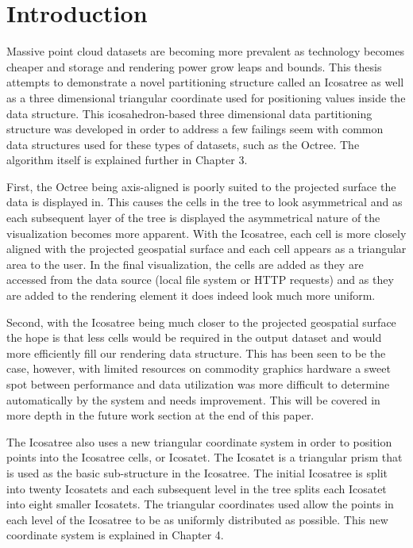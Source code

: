 \chapter{Introduction}


Massive point cloud datasets are becoming more prevalent as technology becomes
cheaper and storage and rendering power grow leaps and bounds. This thesis
attempts to demonstrate a novel partitioning structure called an Icosatree as
well as a three dimensional triangular coordinate used for positioning values
inside the data structure. This icosahedron-based three dimensional data
partitioning structure was developed in order to address a few failings seem
with common data structures used for these types of datasets, such as the
Octree. The algorithm itself is explained further in Chapter 3.

First, the Octree being axis-aligned is poorly suited to the projected surface
the data is displayed in. This causes the cells in the tree to look asymmetrical
and as each subsequent layer of the tree is displayed the asymmetrical nature of
the visualization becomes more apparent. With the Icosatree, each cell is more
closely aligned with the projected geospatial surface and each cell appears as a
triangular area to the user. In the final visualization, the cells are added as
they are accessed from the data source (local file system or HTTP requests) and
as they are added to the rendering element it does indeed look much more
uniform.

Second, with the Icosatree being much closer to the projected geospatial surface
the hope is that less cells would be required in the output dataset and would
more efficiently fill our rendering data structure. This has been seen to be the
case, however, with limited resources on commodity graphics hardware a sweet
spot between performance and data utilization was more difficult to determine
automatically by the system and needs improvement. This will be covered in more
depth in the future work section at the end of this paper.

The Icosatree also uses a new triangular coordinate system in order to position
points into the Icosatree cells, or Icosatet. The Icosatet is a triangular prism
that is used as the basic sub-structure in the Icosatree. The initial Icosatree
is split into twenty Icosatets and each subsequent level in the tree splits each
Icosatet into eight smaller Icosatets. The triangular coordinates used allow the
points in each level of the Icosatree to be as uniformly distributed as
possible. This new coordinate system is explained in Chapter 4.

